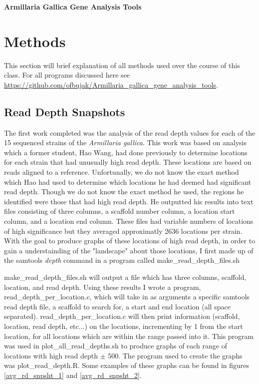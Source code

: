 \documentclass[12pt]{article}
\begin{document}
	
	\begin{center}
	{\bf \Large Armillaria Gallica Gene Analysis Tools}
	\end{center}

%
%

\section{Methods}
This section will brief explanation of all methods used over the course of this class. For all programs discussed here see \url{https://github.com/ofbujak/Armillaria_gallica_gene_analysis_tools}.

\subsection{Read Depth Snapshots}
	The first work completed was the analysis of the read depth values for each of the 15 sequenced strains of the \textit{Armillaria gallica}. This work was based on analysis which a former student, Hao Wang, had done previously to determine locations for each strain that had unusually high read depth. These locations are based on reads aligned to a reference. Unfortunally, we do not know the exact method which Hao had used to determine which locations he had deemed had significant read depth. Though we do not know the exact method he used, the regions he identified were those that had high read depth. He outputted his results into text files consisting of three columns, a scaffold number column, a location start column, and a location end column. These files had variable numbers of locations of high significance but they averaged approximatly 2636 locations per strain. With the goal to produce graphs of these locations of high read depth, in order to gain a understainding of the "landscape" about those locations, I first made up of the samtools \textit{depth} command in a program called make\_read\_depth\_files.sh

make\_read\_depth\_files.sh will output a file which has three columns, scaffold, location, and read depth. Using these results I wrote a program, read\_depth\_per\_location.c, which will take in as arguments a specific samtools read depth file, a scaffold to search for, a start and end location (all space separated). read\_depth\_per\_location.c will then print information (scaffold, location, read depth, etc...) on the locations, incrementing by 1 from the start location, for all locations which are within the range passed into it. This program was used in plot\_all\_read\_depths.sh to produce graphs of each range of locations with high read depth $\pm$ 500. The program used to create the graphs was plot\_read\_depth.R. Some examples of these graphs can be found in figures \ref{avg_rd_snpsht_1} and \ref{avg_rd_snpsht_2}.
	
\end{document}
